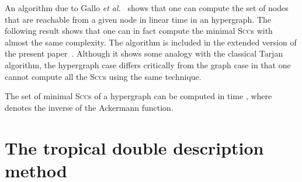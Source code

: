 \documentclass[proceedings]{stacs}
\newcommand{\etal}{\textit{et al.}}
\newcommand{\scc}{\textsc{Scc}}
\begin{document}
An algorithm due to Gallo \etal{}~\cite{GalloDAM93} shows that one can compute the set of nodes that are reachable from a given node in linear time in an hypergraph. 
The following result shows that one can in fact compute
the minimal \scc{}s  with almost the same complexity.
The algorithm is included in the extended version of the present paper~\cite{AGG09}.
Although it shows
some analogy with the classical Tarjan algorithm, 
the hypergraph case differs critically from the graph case
in that one cannot compute all the \scc{}s using the same technique.

\begin{theorem}\label{th-hyper}
The set of minimal \scc{}s of a hypergraph 
can be computed in time , where
 denotes the inverse of the Ackermann function.
\end{theorem}


\section{The tropical double description method}\label{sec:ddm}
\end{document}

